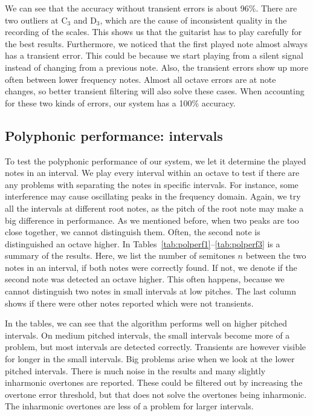 \documentclass[10pt,twocolumn]{article}
\begin{document}
We can see that the accuracy without transient errors is about 96\%. There are two outliers at $\text{C}_3$ and $\text{D}_3$, which are the cause of inconsistent quality in the recording of the scales. This shows us that the guitarist has to play carefully for the best results. Furthermore, we noticed that the first played note almost always has a transient error. This could be because we start playing from a silent signal instead of changing from a previous note. Also, the transient errors show up more often between lower frequency notes. Almost all octave errors are at note changes, so better transient filtering will also solve these cases. When accounting for these two kinds of errors, our system has a 100\% accuracy.

\subsection{Polyphonic performance: intervals}
To test the polyphonic performance of our system, we let it determine the played notes in an interval. We play every interval within an octave to test if there are any problems with separating the notes in specific intervals. For instance, some interference may cause oscillating peaks in the frequency domain. Again, we try all the intervals at different root notes, as the pitch of the root note may make a big difference in performance. As we mentioned before, when two peaks are too close together, we cannot distinguish them. Often, the second note is distinguished an octave higher. In Tables~\ref{tab:polperf1}--\ref{tab:polperf3} is a summary of the results. Here, we list the number of semitones $n$ between the two notes in an interval, if both notes were correctly found. If not, we denote if the second note was detected an octave higher. This often happens, because we cannot distinguish two notes in small intervals at low pitches. The last column shows if there were other notes reported which were not transients.

In the tables, we can see that the algorithm performs well on higher pitched intervals. On medium pitched intervals, the small intervals become more of a problem, but most intervals are detected correctly. Transients are however visible for longer in the small intervals. Big problems arise when we look at the lower pitched intervals. There is much noise in the results and many slightly inharmonic overtones are reported. These could be filtered out by increasing the overtone error threshold, but that does not solve the overtones being inharmonic. The inharmonic overtones are less of a problem for larger intervals.
%
%
\end{document}
